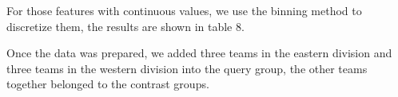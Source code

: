 \documentclass[
 size=14pt,
 paper=smartboard,  %
 mode=present, 		%
 display=slides, 	%
 style=tuliplab,  	%
 pauseslide,
 fleqn,leqno]{powerdot}
\begin{document}
\begin{note}
For those features with continuous values,
we use the binning method to discretize them,
the results are shown in table $8$.

Once the data was prepared,
we added three teams in the eastern division
and three teams in the western division into the query group,
the other teams together belonged to the contrast groups.
\end{note}






\end{document}
